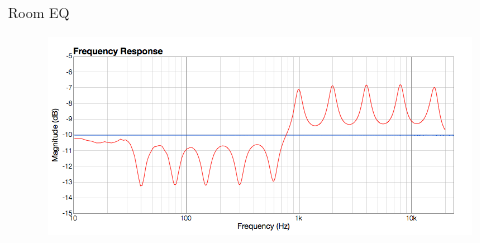 \documentclass{beamer}
\begin{document}
\begin{frame}[t]{Room EQ}
		\begin{figure}[b]
			\includegraphics[height=0.32\textwidth]{figure/roomeq.png}
		\end{figure}
		
	\end{frame}
	
	
\end{document}
